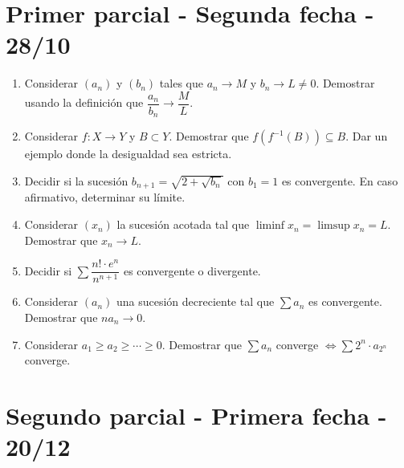 \section{Primer parcial - Segunda fecha - 28/10}

\begin{enumerate}
  \item Considerar $(a_n)$ y $(b_n)$ tales que $a_n \to M$ y $b_n \to L \neq 0$. Demostrar usando la definición que $\dfrac{a_n}{b_n} \to \dfrac{M}{L}$.
  \item Considerar $f: X \to Y$ y $B \subset Y$. Demostrar que $f(f^{-1}(B)) \subseteq B$. Dar un ejemplo donde la desigualdad sea estricta.
  \item Decidir si la sucesión $b_{n+1} = \sqrt{2 + \sqrt{b_n}}$ con $b_1 = 1$ es convergente. En caso afirmativo, determinar su límite.
  \item Considerar $(x_n)$ la sucesión acotada tal que $\liminf x_n = \limsup x_n = L$. Demostrar que $x_n \to L$.
  \item Decidir si $\sum \dfrac{n! \cdot e^n}{n^{n+1}}$ es convergente o divergente.
  \item Considerar $(a_n)$ una sucesión decreciente tal que $\sum a_n$ es convergente. Demostrar que $n a_n \to 0$.
  \item Considerar $a_1 \geq a_2 \geq \cdots \geq 0$. Demostrar que $\sum a_n$ converge $\iff \sum 2^n \cdot a_{2^n}$ converge.
\end{enumerate}

\clearpage

\section{Segundo parcial - Primera fecha - 20/12}

